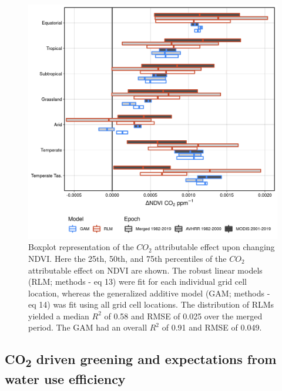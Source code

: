 \documentclass[
]{article}
\begin{document}
\clearpage
\begin{figure}
\includegraphics[width=14cm]{../../figures/Fig6_rlm_CO2_effect_by_epoch} \caption{Boxplot representation of the $CO_2$ attributable effect upon changing NDVI. Here the 25th, 50th, and 75th percentiles of the $CO_2$ attributable effect on NDVI are shown. The robust linear models (RLM; methods - eq 13) were fit for each individual grid cell location, whereas the generalized additive model (GAM; methods - eq 14) was fit using all grid cell locations. The distribution of RLMs yielded a median $R^2$ of 0.58 and RMSE of 0.025 over the merged period. The GAM had an overall $R^2$ of 0.91 and RMSE of 0.049.}\label{fig:unnamed-chunk-5}
\end{figure}
\clearpage

\hypertarget{co2-driven-greening-and-expectations-from-water-use-efficiency}{%
\subsection{\texorpdfstring{CO\textsubscript{2} driven greening and
expectations from water use
efficiency}{CO2 driven greening and expectations from water use efficiency}}\label{co2-driven-greening-and-expectations-from-water-use-efficiency}}
\end{document}
